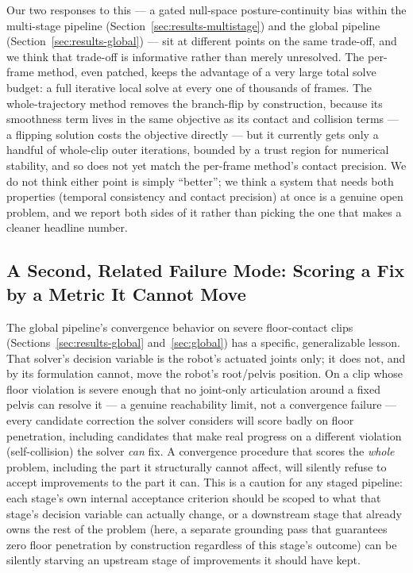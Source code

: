 Our two responses to this --- a gated null-space posture-continuity bias
within the multi-stage pipeline (Section~\ref{sec:results-multistage}) and
the global pipeline (Section~\ref{sec:results-global}) --- sit at different
points on the same trade-off, and we think that trade-off is informative
rather than merely unresolved. The per-frame method, even patched, keeps
the advantage of a very large total solve budget: a full iterative local
solve at every one of thousands of frames. The whole-trajectory method
removes the branch-flip by construction, because its smoothness term lives
in the same objective as its contact and collision terms --- a flipping
solution costs the objective directly --- but it currently gets only a
handful of whole-clip outer iterations, bounded by a trust region for
numerical stability, and so does not yet match the per-frame method's
contact precision. We do not think either point is simply ``better''; we
think a system that needs both properties (temporal consistency and contact
precision) at once is a genuine open problem, and we report both sides of
it rather than picking the one that makes a cleaner headline number.

\subsection{A Second, Related Failure Mode: Scoring a Fix by a Metric It
Cannot Move}
\label{sec:disc-scoring}

The global pipeline's convergence behavior on severe floor-contact clips
(Sections~\ref{sec:results-global} and~\ref{sec:global}) has a specific,
generalizable lesson. That solver's decision variable is the robot's
actuated joints only; it does not, and by its formulation cannot, move the
robot's root/pelvis position. On a clip whose floor violation is severe
enough that no joint-only articulation around a fixed pelvis can resolve it
--- a genuine reachability limit, not a convergence failure --- every
candidate correction the solver considers will score badly on floor
penetration, including candidates that make real progress on a different
violation (self-collision) the solver \textit{can} fix. A convergence
procedure that scores the \textit{whole} problem, including the part it
structurally cannot affect, will silently refuse to accept improvements to
the part it can. This is a caution for any staged pipeline: each stage's
own internal acceptance criterion should be scoped to what that stage's
decision variable can actually change, or a downstream stage that already
owns the rest of the problem (here, a separate grounding pass that
guarantees zero floor penetration by construction regardless of this
stage's outcome) can be silently starving an upstream stage of improvements
it should have kept.

